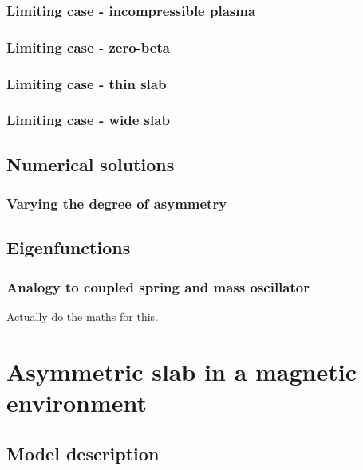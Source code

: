 \documentclass[12pt]{../style-files/ociamthesis}
\begin{document}
\subsubsection{Limiting case - incompressible plasma}

\subsubsection{Limiting case - zero-beta}

\subsubsection{Limiting case - thin slab}

\subsubsection{Limiting case - wide slab}

\subsection{Numerical solutions}

\subsubsection{Varying the degree of asymmetry}

\subsection{Eigenfunctions}

\subsubsection{Analogy to coupled spring and mass oscillator}
Actually do the maths for this.


\section{Asymmetric slab in a magnetic environment}
\label{sec: EVP mag}

\subsection{Model description}
\end{document}
